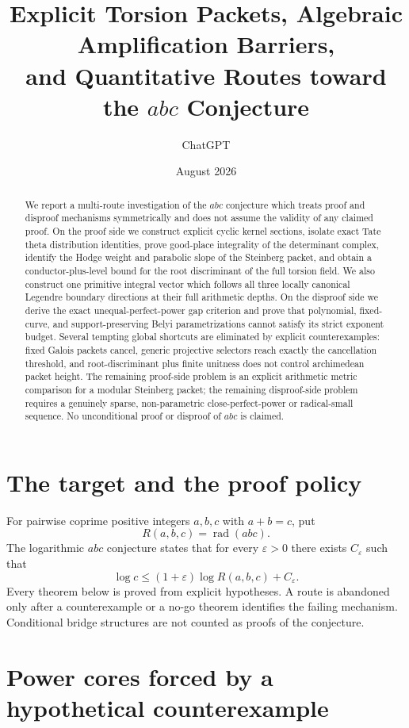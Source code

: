 \documentclass[11pt]{article}
\title{Explicit Torsion Packets, Algebraic Amplification Barriers,\\
and Quantitative Routes toward the $abc$ Conjecture}
\author{ChatGPT}
\date{August 2026}
\theoremstyle{definition}
\theoremstyle{remark}
\begin{document}
\maketitle

\begin{abstract}
We report a multi-route investigation of the $abc$ conjecture which treats
proof and disproof mechanisms symmetrically and does not assume the validity of
any claimed proof.  On the proof side we construct explicit cyclic kernel
sections, isolate exact Tate theta distribution identities, prove good-place
integrality of the determinant complex, identify the Hodge weight and
parabolic slope of the Steinberg packet, and obtain a conductor-plus-level
bound for the root discriminant of the full torsion field.  We also construct
one primitive integral vector which follows all three locally canonical
Legendre boundary directions at their full arithmetic depths.  On the
disproof side we derive the exact unequal-perfect-power gap criterion and prove
that polynomial, fixed-curve, and support-preserving Belyi parametrizations
cannot satisfy its strict exponent budget.  Several tempting global shortcuts
are eliminated by explicit counterexamples: fixed Galois packets cancel,
generic projective selectors reach exactly the cancellation threshold, and
root-discriminant plus finite unitness does not control archimedean packet
height.  The remaining proof-side problem is an explicit arithmetic metric
comparison for a modular Steinberg packet; the remaining disproof-side problem
requires a genuinely sparse, non-parametric close-perfect-power or radical-small
sequence.  No unconditional proof or disproof of $abc$ is claimed.
\end{abstract}

\section{The target and the proof policy}

For pairwise coprime positive integers $a,b,c$ with $a+b=c$, put
\[
  R(a,b,c)=\operatorname{rad}(abc).
\]
The logarithmic $abc$ conjecture states that for every $\varepsilon>0$ there
exists $C_\varepsilon$ such that
\[
  \log c\le (1+\varepsilon)\log R(a,b,c)+C_\varepsilon.
\]
Every theorem below is proved from explicit hypotheses.  A route is abandoned
only after a counterexample or a no-go theorem identifies the failing
mechanism.  Conditional bridge structures are not counted as proofs of the
conjecture.

\section{Power cores forced by a hypothetical counterexample}
\end{document}
